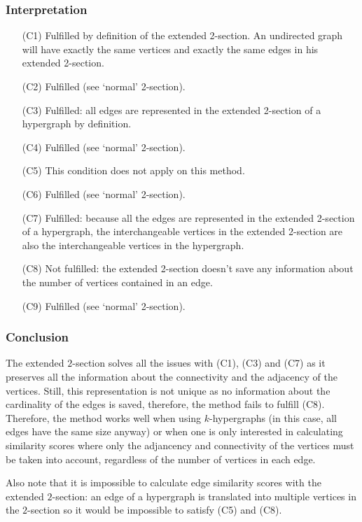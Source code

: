 \documentclass[a4paper,11pt]{report}
\begin{document}
\subsubsection{Interpretation}

\begin{itemize}
  \item[(C1)] Fulfilled by definition of the extended 2-section. An undirected 
  graph will have exactly the same vertices and exactly the same edges in his 
  extended 2-section.
    \item[(C2)] Fulfilled (see `normal' 2-section). 
    \item[(C3)] Fulfilled: all edges are represented in the extended 2-section of 
  a hypergraph by definition.
  \item[(C4)] Fulfilled (see `normal' 2-section).
  \item[(C5)] This condition does not apply on this method.
  \item[(C6)] Fulfilled (see `normal' 2-section).
  \item[(C7)] Fulfilled: because all the edges are represented in the extended 
  2-section of a hypergraph, the interchangeable vertices in the extended 2-section are 
  also the interchangeable vertices in the hypergraph.
  \item[(C8)] Not fulfilled: the extended 2-section doesn't save any information 
  about the number of vertices contained in an edge.
    \item[(C9)] Fulfilled (see `normal' 2-section).
  \end{itemize}  
\subsubsection{Conclusion}
The extended $2$-section solves all the issues with (C1), (C3) and (C7) as it preserves all the information about the connectivity 
and the adjacency of the vertices. Still, this representation is not unique as no information 
about the cardinality of the edges is saved, therefore, the method fails to fulfill (C8). Therefore, the method
works well when using $k$-hypergraphs (in this case, all edges have the same size anyway) 
or when one is only interested in calculating similarity scores where only the 
adjancency  and connectivity of the vertices must be taken into account, regardless of the number
of vertices in each edge.

Also note that it is impossible to calculate edge similarity scores with the extended $2$-section: 
an edge of a 
hypergraph is translated into multiple vertices in the $2$-section so it would 
be impossible to satisfy (C5) and (C8). 
\end{document}
